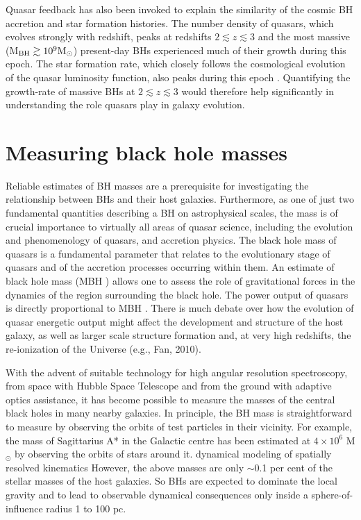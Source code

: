 Quasar feedback has also been invoked to explain the similarity of the cosmic BH accretion and star formation histories.
The number density of quasars, which evolves strongly with redshift, peaks at redshifts $2 \lesssim z \lesssim 3$ \citep[e.g.][]{brandt05,richards06b} and the most massive (M$_{\rm BH} \gtrsim 10^9{{{\rm M_\odot}}}$) present-day BHs experienced much of their growth during this epoch.  
The star formation rate, which closely follows the cosmological evolution of the quasar luminosity function, also peaks during this epoch \citep[e.g.][]{boyle98}. 
Quantifying the growth-rate of massive BHs at $2 \lesssim z \lesssim 3$ would therefore help significantly in understanding the role quasars play in galaxy evolution.

\section{Measuring black hole masses}

Reliable estimates of BH masses are a prerequisite for investigating the relationship between BHs and their host galaxies.  
Furthermore, as one of just two fundamental quantities describing a BH on astrophysical scales, the mass is of crucial importance to virtually all areas of quasar science, including the evolution and phenomenology of quasars, and accretion physics. 
The black hole mass of quasars is a fundamental parameter that relates
to the evolutionary stage of quasars and of the accretion processes occurring
within them. An estimate of black hole mass (MBH ) allows one to assess
the role of gravitational forces in the dynamics of the region surrounding the
black hole. The power output of quasars is directly proportional to MBH .
There is much debate over how the evolution of quasar energetic output
might affect the development and structure of the host galaxy, as well as
larger scale structure formation and, at very high redshifts, the re-ionization
of the Universe (e.g., Fan, 2010).

With the advent of suitable technology for high angular resolution spectroscopy, from
space with Hubble Space Telescope and from the ground with adaptive optics assistance,
it has become possible to measure the masses of the central black holes in many nearby
galaxies.
In principle, the BH mass is straightforward to measure by observing the orbits of test particles in their vicinity.
For example, the mass of Sagittarius A* in the Galactic centre has been estimated at $4\times10^6$ M$_\odot$ by observing the orbits of stars around it. 
dynamical modeling of spatially resolved kinematics
However, the above masses are only $\sim$0.1 per cent of the stellar masses of the host galaxies. So BHs
are expected to dominate the local gravity and to lead to observable dynamical consequences
only inside a sphere-of-influence radius 1 to 100 pc. 


